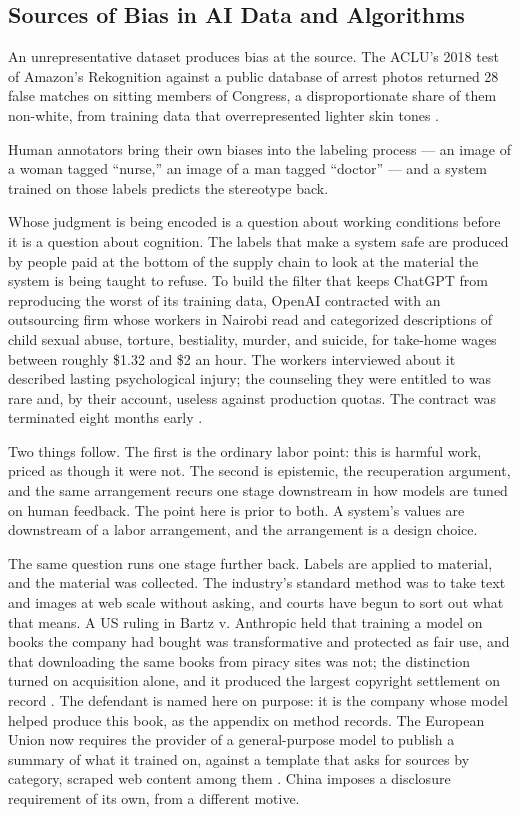 \subsection{Sources of Bias in AI Data and Algorithms}
\label{sec:6.1.1}
An unrepresentative dataset produces bias at the source. The ACLU's 2018 test of Amazon's Rekognition against a public database of arrest photos returned 28 false matches on sitting members of Congress, a disproportionate share of them non-white, from training data that overrepresented lighter skin tones \autocite{snow2018amazons}.

Human annotators bring their own biases into the labeling process — an image of a woman tagged “nurse,” an image of a man tagged “doctor” — and a system trained on those labels predicts the stereotype back.

Whose judgment is being encoded is a question about working conditions before it is a question about cognition. The labels that make a system safe are produced by people paid at the bottom of the supply chain to look at the material the system is being taught to refuse. To build the filter that keeps ChatGPT from reproducing the worst of its training data, OpenAI contracted with an outsourcing firm whose workers in Nairobi read and categorized descriptions of child sexual abuse, torture, bestiality, murder, and suicide, for take-home wages between roughly \$1.32 and \$2 an hour. The workers interviewed about it described lasting psychological injury; the counseling they were entitled to was rare and, by their account, useless against production quotas. The contract was terminated eight months early \autocite{perrigo2023openai}.

Two things follow. The first is the ordinary labor point: this is harmful work, priced as though it were not. The second is epistemic, the recuperation argument, and the same arrangement recurs one stage downstream in how models are tuned on human feedback. The point here is prior to both. A system's values are downstream of a labor arrangement, and the arrangement is a design choice.

The same question runs one stage further back. Labels are applied to material, and the material was collected. The industry's standard method was to take text and images at web scale without asking, and courts have begun to sort out what that means. A US ruling in Bartz v. Anthropic held that training a model on books the company had bought was transformative and protected as fair use, and that downloading the same books from piracy sites was not; the distinction turned on acquisition alone, and it produced the largest copyright settlement on record \autocite{bartz2025fairuse}. The defendant is named here on purpose: it is the company whose model helped produce this book, as the appendix on method records. The European Union now requires the provider of a general-purpose model to publish a summary of what it trained on, against a template that asks for sources by category, scraped web content among them \autocite[Art.~53(1)(d)]{eu2024aiact}. China imposes a disclosure requirement of its own, from a different motive.

